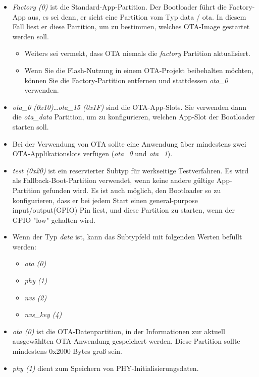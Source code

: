 \begin{itemize}
    \item \textit{Factory (0)} ist die Standard-App-Partition. Der Bootloader führt die Factory-App aus, es sei denn, er sieht eine Partition vom Typ data / ota. In diesem Fall liest er diese Partition, um zu bestimmen, welches OTA-Image gestartet werden soll.
    \begin{itemize}
        \item Weiters sei vermekt, dass OTA niemals die \textit{factory} Partition aktualisiert.
        \item Wenn Sie die Flash-Nutzung in einem OTA-Projekt beibehalten möchten, können Sie die Factory-Partition entfernen und stattdessen \textit{ota\_0} verwenden.
    \end{itemize}
    \item \textit{ota\_0 (0x10)\dots ota\_15 (0x1F)} sind die OTA-App-Slots. Sie verwenden dann die \textit{ota\_data} Partition, um zu konfigurieren, welchen App-Slot der Bootloader starten soll.
    \item Bei der Verwendung von OTA sollte eine Anwendung über mindestens zwei OTA-Applikationslots verfügen (\textit{ota\_0} und \textit{ota\_1}).
    \item \textit{test (0x20)} ist ein reservierter Subtyp für werkseitige Testverfahren. Es wird als Fallback-Boot-Partition verwendet, wenn keine andere gültige App-Partition gefunden wird. Es ist auch möglich, den Bootloader so zu konfigurieren, dass er bei jedem Start einen general-purpose input/output(\textmd{GPIO}) Pin liest, und diese Partition zu starten, wenn der GPIO "low" gehalten wird.
    \pagebreak
    \item Wenn der Typ \textit{data} ist, kann das Subtypfeld mit folgenden Werten befüllt werden:
    \begin{itemize}
        \item \textit{ota (0)}
        \item \textit{phy (1)}
        \item \textit{nvs (2)}
        \item \textit{nvs\_key (4)}
    \end{itemize}
    \item \textit{ota (0)} ist die OTA-Datenpartition, in der Informationen zur aktuell ausgewählten OTA-Anwendung gespeichert werden. Diese Partition sollte mindestens 0x2000 Bytes groß sein.
    \item \textit{phy (1)} dient zum Speichern von PHY-Initialisierungsdaten.

\end{itemize}

